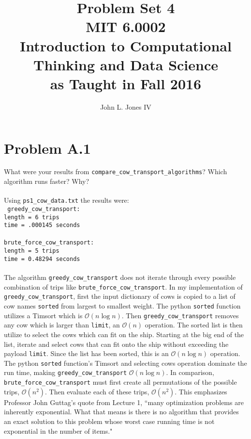 \documentclass[letterpaper,11pt]{article}
\begin{document}
\title{\Huge{Problem Set 4}\\
\vspace{0.125in}
\Large{MIT 6.0002}\\
\large{Introduction to Computational Thinking and Data Science\\
as Taught in Fall 2016}
}
\author{
John L. Jones IV}
\maketitle
\pagebreak
\section*{Problem A.1}
What were your results from \texttt{compare\_cow\_transport\_algorithms}? Which algorithm runs faster? Why? \\
\\
Using \texttt{ps1\_cow\_data.txt} the results were: \\
\texttt{
  greedy\_cow\_transport:\\
  length =  6 trips \\
  time = .000145 seconds \\
  \\
  brute\_force\_cow\_transport: \\
  length =  5 trips \\
  time = 0.48294 seconds \\
}
\\
The algorithm \texttt{greedy\_cow\_transport} does not iterate through every possible combination of trips
like \texttt{brute\_force\_cow\_transport}.
In my implementation of \texttt{greedy\_cow\_transport}, first the input dictionary of cows is copied to a 
list of cow names \texttt{sorted} from largest to smallest weight. 
The python \texttt{sorted} function utilizes a Timsort which is $\mathcal{O}(n\log{}n)$.
Then \texttt{greedy\_cow\_transport} removes any cow which is larger than \texttt{limit},
an $\mathcal{O}(n)$ operation. 
The sorted list is then utilize to select the cows which can fit on the ship.
Starting at the big end of the list,
iterate and select cows that can fit onto the ship without exceeding the payload \texttt{limit}.
Since the list has been sorted, this is an $\mathcal{O}(n\log{}n)$ operation.
The python \texttt{sorted} function's Timsort and 
selecting cows operation dominate the run time,
making \texttt{greedy\_cow\_transport} $\mathcal{O}(n\log{}n)$.
In comparison, \texttt{brute\_force\_cow\_transport} must first create all permutations of the possible trips, 
$\mathcal{O}(n^{2})$.
Then evaluate each of these trips, $\mathcal{O}(n^{2})$.
This emphasizes Professor John Guttag's quote from Lecture 1, ``many optimization problems are inherently exponential.
What that means is there is no algorithm that provides an exact solution to this problem whose worst case running time
is not exponential in the number of items."
\end{document}
